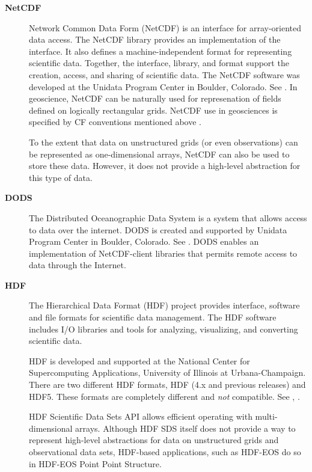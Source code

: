 \begin{description}
\item[\bf NetCDF] Network Common Data Form (NetCDF) is an interface for 
array-oriented data access. The NetCDF library provides an
implementation of the interface. It also defines a 
machine-independent format for representing scientific data. Together,
the interface, library, and format support the creation, access, and
sharing of scientific data. The NetCDF software was developed at the
Unidata Program Center in Boulder, Colorado. See \cite{NetCDF3_UsersGuide_C}.
In geoscience, NetCDF can be naturally used for represenation of fields 
defined on logically rectangular grids. NetCDF use in geosciences is 
specified by CF conventions mentioned above \cite{NetCDF_CF_v1_beta3}. 

To the extent that data on unstructured grids (or even observations) can be 
represented as one-dimensional arrays, NetCDF can also be used to store these 
data. However, it does not provide a high-level abstraction for this type of 
data. 

\item[\bf DODS] The Distributed Oceanographic Data System is a system that 
allows access to data over the internet. DODS is created and supported by 
Unidata Program Center in Boulder, Colorado. See \cite{DODS}. DODS enables an 
implementation of NetCDF-client libraries that permits remote access to data 
through the Internet.


\item[\bf HDF] The Hierarchical Data Format (HDF) project provides
interface,  software and file formats for scientific data management. 
The HDF software includes I/O libraries and tools for analyzing,
visualizing, and converting scientific data. 

HDF is developed and supported at the National Center for Supercomputing 
Applications, University of Illinois at Urbana-Champaign. There are two 
different HDF formats, HDF (4.x and previous releases) and HDF5. These 
formats are completely different and {\it not} compatible.  See
\cite{HDF4_tutorials}, \cite{HDF5_tutorial}.

HDF Scientific Data Sets API allows efficient operating with
multi-dimensional arrays. Although HDF SDS itself does not provide a way
to represent high-level abstractions for data on unstructured grids
and observational data sets, HDF-based applications, such as HDF-EOS
do so in HDF-EOS Point Point Structure.





\end{description}
